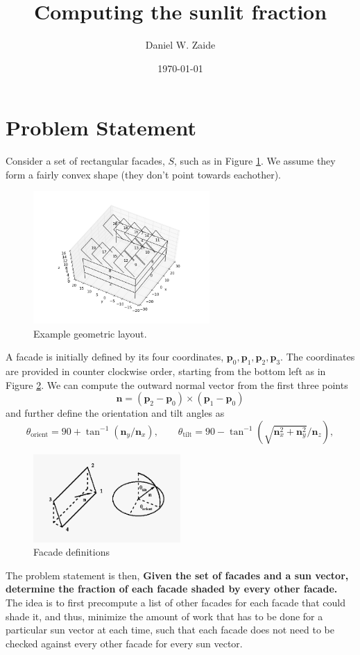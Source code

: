 \documentclass[11pt]{article}
\title{Computing the sunlit fraction}
\author{Daniel W. Zaide}
\date{\today}
\begin{document}
\maketitle
\section{Problem Statement}
Consider a set of rectangular facades, $S$, such as in Figure \ref{geomex}. We assume they form a fairly convex shape (they don't point towards eachother). 

\begin{figure}[!ht]
\centering
\includegraphics[width=0.6\textwidth]{images/whole-building.png}
\caption{Example geometric layout.}
\label{geomex}
\end{figure}
A facade is initially defined by its four coordinates, $\mathbf{p}_{0}, \mathbf{p}_{1}, \mathbf{p}_{2},\mathbf{p}_{3}$. The coordinates are provided in counter clockwise order, starting from the bottom left as in Figure \ref{definitions}. We can compute the outward normal vector from the first three points
\[
\mathbf{n} = (\mathbf{p}_2-\mathbf{p}_0) \times (\mathbf{p}_1-\mathbf{p}_0)
\] and further define the orientation and tilt angles as
\[
\theta_{\mathrm{orient}} = 90+\tan^{-1}(\mathbf{n}_y/\mathbf{n}_x), 
\qquad \theta_{\mathrm{tilt}} = 90 - \tan^{-1}\left(\sqrt{\mathbf{n}_{x}^2+\mathbf{n}_{y}^2}/\mathbf{n}_z\right), 
\]

\begin{figure}[!ht]
\centering
\includegraphics[width=0.50\textwidth]{images/geomdefine.png}

\caption{Facade definitions}
\label{definitions}
\end{figure}
The problem statement is then, {\bf
Given the set of facades and a sun vector, determine the fraction of each facade shaded by every other facade.} The idea is to first precompute a list of other facades for each facade that could shade it, and thus, minimize the amount of work that has to be done for a particular sun vector at each time, such that each facade does not need to be checked against every other facade for every sun vector.
\end{document}
